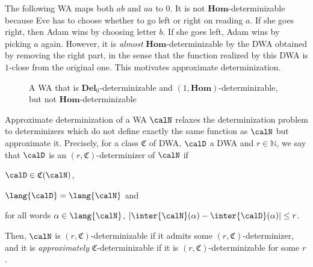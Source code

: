 \documentclass[a4paper]{article}
\begin{document}
\begin{example}\label{ex:regret}
The following WA maps both $ab$ and $aa$ to $0$. It is not 
$\mathbf{Hom}$-determinizable because Eve has to choose whether to go
left or right on reading $a$. If she goes right, then Adam wins by
choosing letter $b$. If she goes left, Adam wins by picking $a$
again. However, it is \emph{almost} $\mathbf{Hom}$-determinizable by the DWA
obtained by removing the right part, in the sense that the function
realized by this DWA is $1$-close from the original one. This
motivates approximate determinization. 
\begin{figure}[h]
\begin{center}
\end{center}
\caption{A WA that is $\mathbf{Del}_0$-determinizable and 
$(1,\mathbf{Hom})$-determinizable, but not $\mathbf{Hom}$-determinizable}
\label{fig:example3}
\end{figure}


\end{example}

 Approximate
determinization of a WA $\calN$ relaxes the determinization problem
to determinizers which do not define
exactly the same function as $\calN$ but approximate it. Precisely, for a class
$\mathfrak{C}$ of DWA, $\calD$ a DWA and $r\in\mathbb{N}$,
we say that $\calD$ is an
$(r,\mathfrak{C})$-determinizer of $\calN$ if
\begin{inparaenum}[$(i)$]
\item $\calD\in \mathfrak{C}(\calN)$,
\item $\lang{\calD} = \lang{\calN}$ and
\item for all words $\alpha \in \lang{\calN}$, $|\inter{\calN}(\alpha)-\inter{\calD}(\alpha)|\leq r$.
\end{inparaenum}
Then, $\calN$ is $(r,\mathfrak{C})$-determinizable if
it admits some $(r,\mathfrak{C})$-determinizer, and it is 
\emph{approximately} $\mathfrak{C}$-determinizable if it is 
$(r,\mathfrak{C})$-determinizable for some $r$. 
\end{document}

